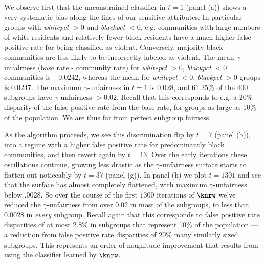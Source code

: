 We observe first that the unconstrained classifier in $t = 1$ (panel (a))
shows a very systematic bias along the lines of our sensitive attributes. In particular groups with \textit{whitepct} $> 0$ and \textit{blackpct} $< 0$, e.g. communities with large numbers of white residents and relatively fewer black residents have a much higher false positive rate for being classified as violent.
Conversely, majority black communities are less likely to be incorrectly labeled as violent.
The mean $\gamma$-unfairness (base rate - community rate) for  \textit{whitepct} $> 0$,  \textit{blackpct} $< 0$
communities is $-0.0242$, whereas the mean for \textit{whitepct} $< 0$,  \textit{blackpct} $ > 0$ groups is
$0.0247$. The maximum $\gamma$-unfairness in $t = 1$ is $0.028$, and $61.25\%$ of the $400$ subgroups have $\gamma$-unfairness $ > 0.02$. Recall that this corresponds to e.g. a $20\%$ disparity of the false positive rate from the base rate, for groups as large as 10\% of the population. 
We are thus far from perfect subgroup fairness.

As the algorithm proceeds, we see this discrimination flip by $t = 7$ (panel (b)),
into a regime with a higher false positive rate for predominantly black communities,
and then revert again by $t = 13$. Over the early iterations these oscillations continue, growing less
drastic as the $\gamma$-unfairness surface starts to flatten out noticeably by $t = 37$ (panel (g)).
In panel (h) we plot $t = 1301$ and see that the surface has almost completely
flattened, with maximum $\gamma$-unfairness below $.0028$.
So over the course of the first $1300$ iterations of $\knrw$ we've reduced the
$\gamma$-unfairness from over $0.02$ in most of the subgroups,
to less than $0.0028$ in \textit{every} subgroup. 
Recall again that this corresponds to false positive rate disparities of at most 2.8\% in subgroups that represent 10\% of the population --- a reduction from false positive rate disparities of 20\% many similarly sized subgroups. This represents an order of magnitude improvement that results from using the classifier learned by $\knrw$. 

